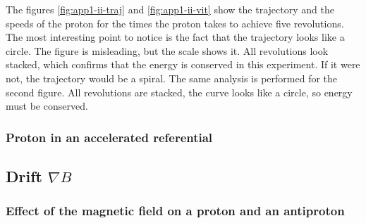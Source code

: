 \documentclass[a4paper,12pt,twoside]{article}
\begin{document}
The figures \ref{fig:app1-ii-traj} and \ref{fig:app1-ii-vit} show the trajectory and the speeds of the proton for the times the proton takes to achieve five revolutions.
The most interesting point to notice is the fact that the trajectory looks like a circle.
The figure is misleading, but the scale shows it.
All revolutions look stacked, which confirms that the energy is conserved in this experiment.
If it were not, the trajectory would be a spiral.
The same analysis is performed for the second figure.
All revolutions are stacked, the curve looks like a circle, so energy must be conserved.\\


\subsubsection{Proton in an accelerated referential}

\subsection{Drift $\nabla B$}

\subsubsection{Effect of the magnetic field on a proton and an antiproton}
\end{document}
